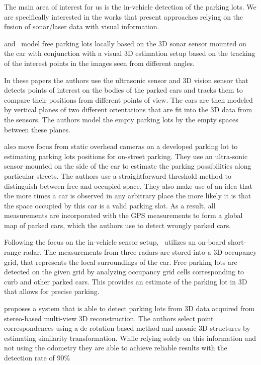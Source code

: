 The main area of interest for us is the in-vehicle detection of the parking
lots. We are specifically interested in the works that present approaches
relying on the fusion of sonar/laser data with visual information.

\citet{fintyelvestri} and~\citet{abadvestri} model free parking lots locally
based on the 3D sonar sensor mounted on the car with conjunction with a visual
3D estimation setup based on the tracking of the interest points in the images
seen from different angles.

In these papers the authors use the ultrasonic sensor and 3D vision sensor
that detects points of interest on the bodies of the parked cars and tracks
them to compare their positions from different points of view. The cars are
then modeled by vertical planes of two different orientations that are fit
into the 3D data from the sensors. The authors model the empty parking lots by
the empty spaces between these planes.

\citet{vladimircoric} also move focus from static overhead cameras on a
developed parking lot to estimating parking lots positions for on-street
parking. They use an ultra-sonic sensor mounted on the side of the car to
estimate the parking possibilities along particular streets. The authors use a
straightforward threshold method to distinguish between free and occupied
space. They also make use of an idea that the more times a car is observed in
any arbitrary place the more likely it is that the space occupied by this car
is a valid parking slot. As a result, all measurements are incorporated with
the GPS measurements to form a global map of parked cars, which the authors
use to detect wrongly parked cars.

Following the focus on the in-vehicle sensor setup,~\citet{schmid11} utilizes
an on-board short-range radar. The measurements from three radars are stored
into a 3D occupancy grid, that represents the local surroundings of the car.
Free parking lots are detected on the given grid by analyzing occupancy grid
cells corresponding to curb and other parked cars. This provides an estimate
of the parking lot in 3D that allows for precise parking.

\citet{suhr10} proposes a system that is able to detect parking lots from 3D
data acquired from stereo-based multi-view 3D reconstruction. The authors
select point correspondences using a de-rotation-based method and mosaic 3D
structures by estimating similarity transformation. While relying solely on
this information and not using the odometry they are able to achieve reliable
results with the detection rate of 90\%

